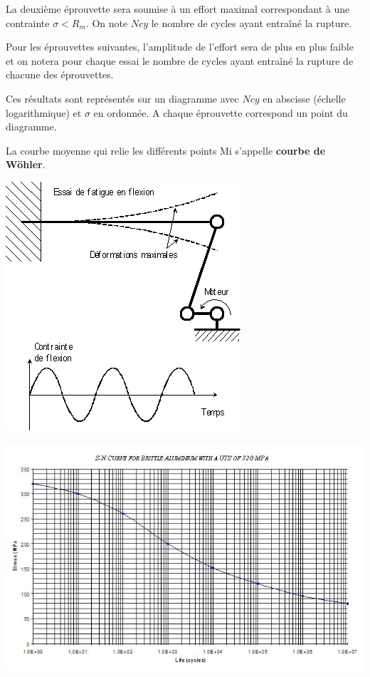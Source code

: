 \documentclass[11pt,oneside]{article}
\begin{document}
La deuxième éprouvette sera soumise à un effort maximal correspondant à une contrainte $\sigma < R_m$. On note $Ncy$ le nombre de cycles ayant entraîné la rupture. 

Pour les éprouvettes suivantes, l'amplitude de l'effort sera de plus en plus faible et on notera pour chaque essai le nombre de cycles ayant entraîné la rupture de chacune des éprouvettes. 

Ces résultats sont représentés sur un diagramme avec $Ncy$ en abscisse (échelle logarithmique) et $\sigma$ en ordonnée. A chaque éprouvette correspond un point du diagramme. 

La courbe moyenne qui relie les différents points Mi s'appelle \textbf{courbe de Wöhler}.


\begin{minipage}[c]{.45\linewidth}
\begin{center}
\includegraphics[width=.9\textwidth]{png/wohler_2}
\end{center}
\end{minipage}\hfill
\begin{minipage}[c]{.45\linewidth}
\begin{center}
\includegraphics[width=.95\textwidth]{png/wohler}
\end{center}
\end{minipage}
\end{document}
